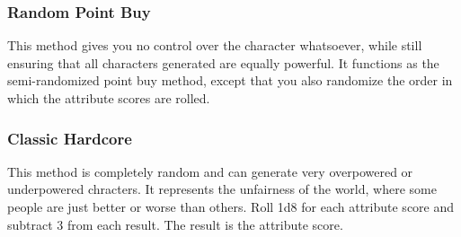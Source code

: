 \subsubsection{Random Point Buy}
This method gives you no control over the character whatsoever, while still ensuring that all characters generated are equally powerful. It functions as the semi-randomized point buy method, except that you also randomize the order in which the attribute scores are rolled.

\begin{comment}
\subsubsection{Weighted Semi-Randomized Point Buy}
This method gives you more control over your attribute scores, while still requiring you to deal with attribute score advantages or disadvantages that you might not have chosen. It functions like the semi-randomized point buy method, except that you do not roll 3d6 for every attribute score. You have a pool of 18 dice. You can distribute those dice as you choose between each attribute score, except the last one, which is automatically assigned your remaining points. If you roll more than three dice for an attribute score, keep only the highest 3 dice. If you assign fewer than three dice to roll for an attribute score, add 1 to the result for every die less than 3 you are rolling. You can roll as many as six dice for a single attribute score, and you cannot roll less than one die for an attribute score.

For example, player hoping to play a barbarian might assign six dice to Strength, five dice to Constitution, three dice to Dexterity, and two dice to each of Intelligence and Wisdom, leaving the rest of the points to Charisma.
\end{comment}

\subsubsection{Classic Hardcore}

This method is completely random and can generate very overpowered or underpowered chracters. It represents the unfairness of the world, where some people are just better or worse than others. Roll 1d8 for each attribute score and subtract 3 from each result. The result is the attribute score.
